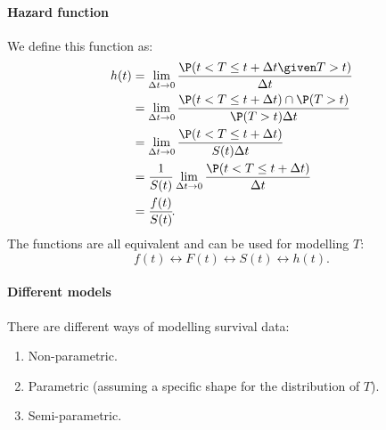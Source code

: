 \paragraph{Hazard function}

We define this function as:
\begin{equation}
    \begin{aligned}
        h(t) & = \lim_{\Delta t \to 0} \frac{\P(t < T \leq t + \Delta t \given T > t)}{\Delta t}              \\
             & = \lim_{\Delta t \to 0} \frac{\P(t < T \leq t + \Delta t) \cap \P(T > t)}{\P(T > t) \Delta t} \\
             & = \lim_{\Delta t \to 0} \frac{\P(t < T \leq t + \Delta t)}{S(t) \Delta t}                      \\
             & = \frac{1}{S(t)} \lim_{\Delta t \to 0} \frac{\P(t < T \leq t + \Delta t)}{\Delta t}            \\
             & = \frac{f(t)}{S(t)}\negthinspace.
    \end{aligned}
\end{equation}
The functions are all equivalent and can be used for modelling $T$:
\begin{equation}
    f(t) \longleftrightarrow F(t) \longleftrightarrow S(t) \longleftrightarrow h(t).
\end{equation}

\paragraph{Different models} There are different ways of modelling survival data:
\begin{enumerate}
    \item Non-parametric.
    \item Parametric (assuming a specific shape for the distribution of $T$).
    \item Semi-parametric.
\end{enumerate}

